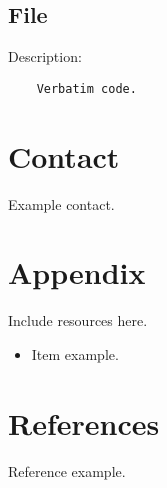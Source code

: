 \documentclass[12pt,a4paper]{article}
\begin{document}
\subsection{File}

\begin{center}
Description:
	\begin{verbatim}
	Verbatim code.
	\end{verbatim}
\end{center}


\section{Contact}

Example contact.


\section{Appendix}
Include resources here.

\begin{itemize}
	\item Item example.
\end{itemize}


\section{References}


\noindent [1] Reference example.

\end{document}
